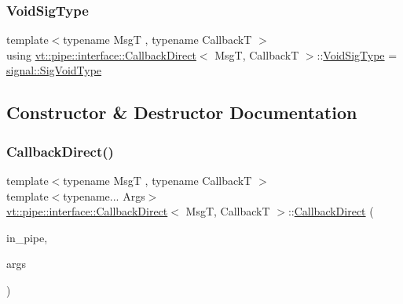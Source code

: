\mbox{\label{structvt_1_1pipe_1_1interface_1_1_callback_direct_ae35dd09260d13dbdd8444a208e552070}} 
\subsubsection{\texorpdfstring{Void\+Sig\+Type}{VoidSigType}}
{\footnotesize\ttfamily template$<$typename MsgT , typename CallbackT $>$ \\
using \hyperlink{structvt_1_1pipe_1_1interface_1_1_callback_direct}{vt\+::pipe\+::interface\+::\+Callback\+Direct}$<$ MsgT, CallbackT $>$\+::\hyperlink{structvt_1_1pipe_1_1interface_1_1_callback_direct_ae35dd09260d13dbdd8444a208e552070}{Void\+Sig\+Type} =  \hyperlink{namespacevt_1_1pipe_1_1signal_acbe257d1ae44f20fa9fd9b6ed3057caf}{signal\+::\+Sig\+Void\+Type}}



\subsection{Constructor \& Destructor Documentation}
\mbox{\label{structvt_1_1pipe_1_1interface_1_1_callback_direct_acb59da0daedf51b2556d603b8910325e}} 
\subsubsection{\texorpdfstring{Callback\+Direct()}{CallbackDirect()}}
{\footnotesize\ttfamily template$<$typename MsgT , typename CallbackT $>$ \\
template$<$typename... Args$>$ \\
\hyperlink{structvt_1_1pipe_1_1interface_1_1_callback_direct}{vt\+::pipe\+::interface\+::\+Callback\+Direct}$<$ MsgT, CallbackT $>$\+::\hyperlink{structvt_1_1pipe_1_1interface_1_1_callback_direct}{Callback\+Direct} (\begin{DoxyParamCaption}\item[{\hyperlink{namespacevt_ac9852acda74d1896f48f406cd72c7bd3}{Pipe\+Type} const \&}]{in\+\_\+pipe,  }\item[{Args...}]{args }\end{DoxyParamCaption})\hspace{0.3cm}{\ttfamily [inline]}}



